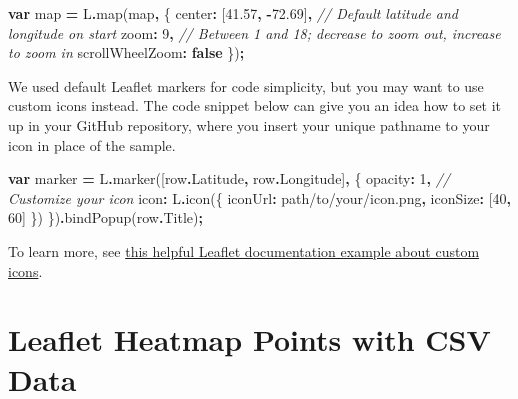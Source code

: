 \documentclass[
  english,
]{book}
\newenvironment{Shaded}{\begin{snugshade}}{\end{snugshade}}
\newcommand{\AttributeTok}[1]{\textcolor[rgb]{0.77,0.63,0.00}{#1}}
\newcommand{\CommentTok}[1]{\textcolor[rgb]{0.56,0.35,0.01}{\textit{#1}}}
\newcommand{\DataTypeTok}[1]{\textcolor[rgb]{0.13,0.29,0.53}{#1}}
\newcommand{\DecValTok}[1]{\textcolor[rgb]{0.00,0.00,0.81}{#1}}
\newcommand{\FloatTok}[1]{\textcolor[rgb]{0.00,0.00,0.81}{#1}}
\newcommand{\FunctionTok}[1]{\textcolor[rgb]{0.00,0.00,0.00}{#1}}
\newcommand{\KeywordTok}[1]{\textcolor[rgb]{0.13,0.29,0.53}{\textbf{#1}}}
\newcommand{\NormalTok}[1]{#1}
\newcommand{\OperatorTok}[1]{\textcolor[rgb]{0.81,0.36,0.00}{\textbf{#1}}}
\newcommand{\StringTok}[1]{\textcolor[rgb]{0.31,0.60,0.02}{#1}}
\begin{document}
\begin{Shaded}
\begin{Highlighting}[]
\KeywordTok{var}\NormalTok{ map }\OperatorTok{=}\NormalTok{ L}\OperatorTok{.}\FunctionTok{map}\NormalTok{(}\StringTok{\textquotesingle{}map\textquotesingle{}}\OperatorTok{,}\NormalTok{ \{}
  \DataTypeTok{center}\OperatorTok{:}\NormalTok{ [}\FloatTok{41.57}\OperatorTok{,} \OperatorTok{{-}}\FloatTok{72.69}\NormalTok{]}\OperatorTok{,} \CommentTok{// Default latitude and longitude on start}
  \DataTypeTok{zoom}\OperatorTok{:} \DecValTok{9}\OperatorTok{,}  \CommentTok{// Between 1 and 18; decrease to zoom out, increase to zoom in}
  \DataTypeTok{scrollWheelZoom}\OperatorTok{:} \KeywordTok{false}
\NormalTok{\})}\OperatorTok{;}
\end{Highlighting}
\end{Shaded}

We used default Leaflet markers for code simplicity, but you may want to use
custom icons instead. The code snippet below can give you an idea how to set it up in your GitHub repository, where you insert your unique pathname to your icon in place of the sample.

\begin{Shaded}
\begin{Highlighting}[]
\KeywordTok{var}\NormalTok{ marker }\OperatorTok{=}\NormalTok{ L}\OperatorTok{.}\FunctionTok{marker}\NormalTok{([row}\OperatorTok{.}\AttributeTok{Latitude}\OperatorTok{,}\NormalTok{ row}\OperatorTok{.}\AttributeTok{Longitude}\NormalTok{]}\OperatorTok{,}\NormalTok{ \{}
  \DataTypeTok{opacity}\OperatorTok{:} \DecValTok{1}\OperatorTok{,}
  \CommentTok{// Customize your icon}
  \DataTypeTok{icon}\OperatorTok{:}\NormalTok{ L}\OperatorTok{.}\FunctionTok{icon}\NormalTok{(\{}
    \DataTypeTok{iconUrl}\OperatorTok{:} \StringTok{\textquotesingle{}path/to/your/icon.png\textquotesingle{}}\OperatorTok{,}
    \DataTypeTok{iconSize}\OperatorTok{:}\NormalTok{ [}\DecValTok{40}\OperatorTok{,} \DecValTok{60}\NormalTok{]}
\NormalTok{  \})}
\NormalTok{\})}\OperatorTok{.}\FunctionTok{bindPopup}\NormalTok{(row}\OperatorTok{.}\AttributeTok{Title}\NormalTok{)}\OperatorTok{;}
\end{Highlighting}
\end{Shaded}

To learn more, see \href{https://leafletjs.com/examples/custom-icons/}{this helpful Leaflet documentation example about custom icons}.

\hypertarget{leaflet-heatmap}{%
\section*{Leaflet Heatmap Points with CSV Data}\label{leaflet-heatmap}}
\end{document}
